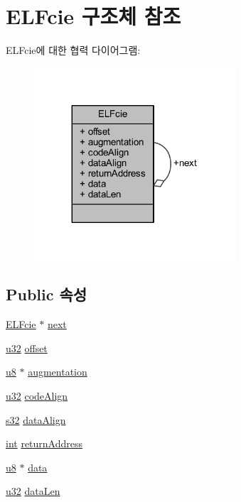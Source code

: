 \hypertarget{struct_e_l_fcie}{}\section{E\+L\+Fcie 구조체 참조}
\label{struct_e_l_fcie}


E\+L\+Fcie에 대한 협력 다이어그램\+:\nopagebreak
\begin{figure}[H]
\begin{center}
\leavevmode
\includegraphics[width=212pt]{struct_e_l_fcie__coll__graph}
\end{center}
\end{figure}
\subsection*{Public 속성}
\begin{DoxyCompactItemize}
\item 
\mbox{\hyperlink{struct_e_l_fcie}{E\+L\+Fcie}} $\ast$ \mbox{\hyperlink{struct_e_l_fcie_a478060c105cc829f5b800d20d05d4901}{next}}
\item 
\mbox{\hyperlink{_system_8h_a10e94b422ef0c20dcdec20d31a1f5049}{u32}} \mbox{\hyperlink{struct_e_l_fcie_ad77ede21a2619e2a994435f11df3cf53}{offset}}
\item 
\mbox{\hyperlink{_system_8h_aed742c436da53c1080638ce6ef7d13de}{u8}} $\ast$ \mbox{\hyperlink{struct_e_l_fcie_a181b83638e92b83dfc39c641ac71557b}{augmentation}}
\item 
\mbox{\hyperlink{_system_8h_a10e94b422ef0c20dcdec20d31a1f5049}{u32}} \mbox{\hyperlink{struct_e_l_fcie_aec7907fb3c0c13aeba624a1dea3e14ca}{code\+Align}}
\item 
\mbox{\hyperlink{_system_8h_a0ce6887c26c1c49ad3be5710dd42bfd6}{s32}} \mbox{\hyperlink{struct_e_l_fcie_af5d3149b3520f0d56dd96c6f0df8e60f}{data\+Align}}
\item 
\mbox{\hyperlink{_util_8cpp_a0ef32aa8672df19503a49fab2d0c8071}{int}} \mbox{\hyperlink{struct_e_l_fcie_a5c87d6ce3906a0421f5815bda3520abf}{return\+Address}}
\item 
\mbox{\hyperlink{_system_8h_aed742c436da53c1080638ce6ef7d13de}{u8}} $\ast$ \mbox{\hyperlink{struct_e_l_fcie_a24ea835dfe2a5089b098aae27a6de0d8}{data}}
\item 
\mbox{\hyperlink{_system_8h_a10e94b422ef0c20dcdec20d31a1f5049}{u32}} \mbox{\hyperlink{struct_e_l_fcie_a19efbc40471e1308ea700858a74aaa49}{data\+Len}}
\end{DoxyCompactItemize}


